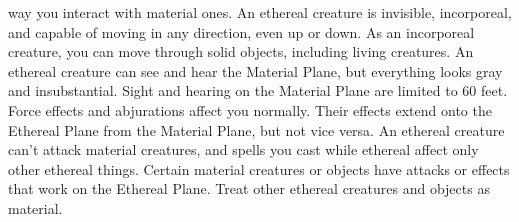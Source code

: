 way you interact with material ones.
An ethereal creature is invisible, incorporeal, and capable of moving in any direction,
even up or down. As an incorporeal creature, you can move through solid objects,
including living creatures.
An ethereal creature can see and hear the Material Plane, but everything looks
gray and insubstantial. Sight and hearing on the Material Plane are limited to
60 feet.
Force effects and abjurations affect you normally. Their effects extend onto the
Ethereal Plane from the Material Plane, but not vice versa. An ethereal creature
can't attack material creatures, and spells you cast while ethereal affect only
other ethereal things. Certain material creatures or objects have attacks or effects
that work on the Ethereal Plane. Treat other ethereal creatures and objects as
material.